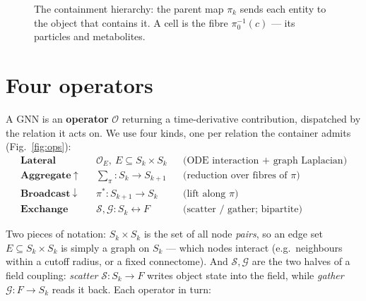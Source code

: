 \documentclass[11pt]{article}
\begin{document}
\begin{figure}[h]
\centering
{}
\caption{The containment hierarchy: the parent map $\pi_k$ sends each entity to the
object that contains it. A cell is the fibre $\pi_0^{-1}(c)$ --- its particles and
metabolites.}
\label{fig:hier}
\end{figure}

\section{Four operators}
\label{sec:operators}

A GNN is an \textbf{operator} $\mathcal{O}$ returning a time-derivative
contribution, dispatched by the relation it acts on. We use four kinds, one per
relation the container admits (Fig.~\ref{fig:ops}):
\begin{align*}
\textbf{Lateral}\quad   & \mathcal{O}_E,\ E\subseteq S_k\times S_k
  &&\text{(ODE interaction $+$ graph Laplacian)}\\
\textbf{Aggregate}\ \uparrow\quad & \textstyle\sum_{\pi}: S_k \to S_{k+1}
  &&\text{(reduction over fibres of $\pi$)}\\
\textbf{Broadcast}\ \downarrow\quad & \pi^{*}: S_{k+1}\to S_k
  &&\text{(lift along $\pi$)}\\
\textbf{Exchange}\quad  & \mathcal{S},\mathcal{G}: S_k \leftrightarrow F
  &&\text{(scatter / gather; bipartite)}
\end{align*}

\noindent Two pieces of notation: $S_k\times S_k$ is the set of all node \emph{pairs}, so an
edge set $E\subseteq S_k\times S_k$ is simply a graph on $S_k$ --- which nodes
interact (e.g.\ neighbours within a cutoff radius, or a fixed connectome). And
$\mathcal{S},\mathcal{G}$ are the two halves of a field coupling: \emph{scatter}
$\mathcal{S}:S_k\to F$ writes object state into the field, while \emph{gather}
$\mathcal{G}:F\to S_k$ reads it back. Each operator in turn:
\end{document}
